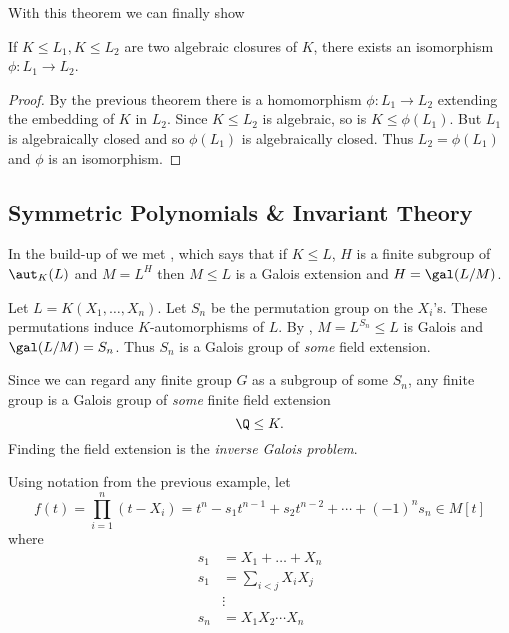 \documentclass[a4paper]{article}
\begin{document}
With this theorem we can finally show

\begin{theorem}
  If \(K \leq L_1, K \leq L_2\) are two algebraic closures of \(K\), there exists an isomorphism \(\phi: L_1 \to L_2\).
\end{theorem}

\begin{proof}
  By the previous theorem there is a homomorphism \(\phi: L_1 \to L_2\) extending the embedding of \(K\) in \(L_2\). Since \(K \leq L_2\) is algebraic, so is \(K \leq \phi(L_1)\). But \(L_1\) is algebraically closed and so \(\phi(L_1)\) is algebraically closed. Thus \(L_2 = \phi(L_1)\) and \(\phi\) is an isomorphism.
\end{proof}

\subsection{Symmetric Polynomials \& Invariant Theory}

In the build-up of  we met , which says that if \(K \leq L\), \(H\) is a finite subgroup of \(\aut_K(L)\) and \(M = L^H\) then \(M \leq L\) is a Galois extension and \(H = \gal(L/M)\).

\begin{eg}
  Let \(L = K(X_1, \dots, X_n)\). Let \(S_n\) be the permutation group on the \(X_i\)'s. These permutations induce \(K\)-automorphisms of \(L\). By , \(M = L^{S_n} \leq L\) is Galois and \(\gal(L/M) = S_n\). Thus \(S_n\) is a Galois group of \emph{some} field extension.

\end{eg}

Since we can regard any finite group \(G\) as a subgroup of some \(S_n\), any finite group is a Galois group of \emph{some} finite field extension
\[
  \Q \leq K.
\]
Finding the field extension is the \emph{inverse Galois problem}.

Using notation from the previous example, let
\[
  f(t) = \prod_{i = 1}^n (t - X_i) = t^n - s_1 t^{n - 1} + s_2 t^{n - 2} + \cdots + (-1)^n s_n \in M[t]
\]
where
\begin{align*}
  s_1 &= X_1 + \dots + X_n \\
  s_1 &= \sum_{i < j} X_iX_j \\
      &\vdots \\
  s_n &= X_1X_2\cdots X_n
\end{align*}
\end{document}
